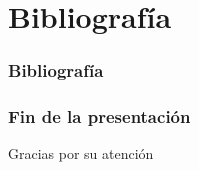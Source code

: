 \documentclass{beamer}
\begin{document}

\section{Bibliografía}
\begin{frame}[allowframebreaks]
  \frametitle{Bibliografía}
  
  
  \nocite{*}
\end{frame}

\begin{frame}
  \frametitle{Fin de la presentación}
  \begin{center}
    \Huge{Gracias por su atención}
  \end{center}
\end{frame}
\end{document}

